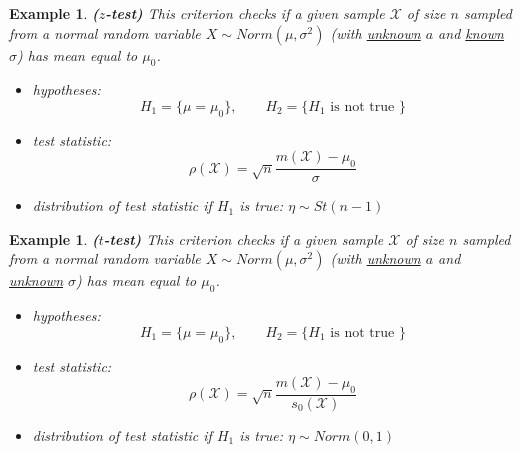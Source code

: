 \documentclass[12pt]{article}
\newtheorem{example}[theorem]{Example}
\begin{document}
\begin{example} \textbf{($z$-test)} This criterion checks if a given sample $\mathscr{X}$ of size $n$ sampled from a normal random variable $X\sim Norm(\mu,\sigma^2)$ (with \underline{unknown} $a$ and \underline{known} $\sigma$) has mean equal to $\mu_0$.
\begin{itemize}
    \item hypotheses: 
    $$H_1=\{\mu=\mu_0\},\quad\quad H_2=\{H_1\mbox{ is not true }\}$$
    \item test statistic: 
    $$\rho(\mathscr{X})=\sqrt{n}\frac{m(\mathscr{X})-\mu_0}{\sigma}$$
    \item distribution of test statistic if $H_1$ is true: $\eta\sim St(n-1)$
\end{itemize}
\end{example}

\begin{example} \textbf{($t$-test)} This criterion checks if a given sample $\mathscr{X}$ of size $n$ sampled from a normal random variable $X\sim Norm(\mu,\sigma^2)$ (with \underline{unknown} $a$ and \underline{unknown} $\sigma$) has mean equal to $\mu_0$.
\begin{itemize}
    \item hypotheses: 
    $$H_1=\{\mu=\mu_0\},\quad\quad H_2=\{H_1\mbox{ is not true }\}$$
    \item test statistic: 
    $$\rho(\mathscr{X})=\sqrt{n}\frac{m(\mathscr{X})-\mu_0}{s_0(\mathscr{X})}$$
    \item distribution of test statistic if $H_1$ is true: $\eta\sim Norm(0,1)$
\end{itemize}
\end{example}
\end{document}
